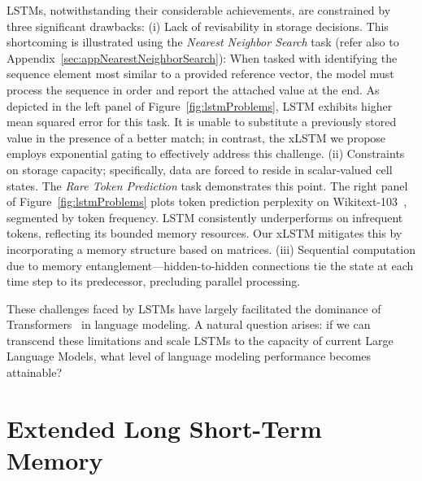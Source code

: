 LSTMs, notwithstanding their considerable achievements, are constrained by three significant drawbacks: (i) Lack of revisability in storage decisions. This shortcoming is illustrated using the {\it Nearest Neighbor Search} task (refer also to Appendix~\ref{sec:appNearestNeighborSearch}): When tasked with identifying the sequence element most similar to a provided reference vector, the model must process the sequence in order and report the attached value at the end. As depicted in the left panel of Figure~\ref{fig:lstmProblems}, LSTM exhibits higher mean squared error for this task. It is unable to substitute a previously stored value in the presence of a better match; in contrast, the xLSTM we propose employs exponential gating to effectively address this challenge. (ii) Constraints on storage capacity; specifically, data are forced to reside in scalar-valued cell states. The {\it Rare Token Prediction} task demonstrates this point. The right panel of Figure~\ref{fig:lstmProblems} plots token prediction perplexity on Wikitext-103~\citep{Merity:17}, segmented by token frequency. LSTM consistently underperforms on infrequent tokens, reflecting its bounded memory resources. Our xLSTM mitigates this by incorporating a memory structure based on matrices. (iii) Sequential computation due to memory entanglement—hidden-to-hidden connections tie the state at each time step to its predecessor, precluding parallel processing.

These challenges faced by LSTMs have largely facilitated the dominance of Transformers~\citep{Vaswani:17} in language modeling. A natural question arises: if we can transcend these limitations and scale LSTMs to the capacity of current Large Language Models, what level of language modeling performance becomes attainable?

\section{Extended Long Short-Term Memory}
\label{sec:xLSTM}

